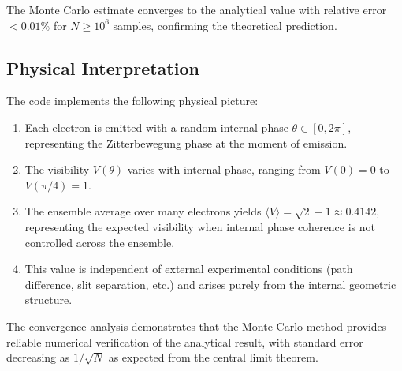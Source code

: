 \documentclass[%
 reprint,
 amsmath,amssymb,
 aps,
 prb,
]{revtex4-2}
\numberwithin{equation}{section}
\begin{document}
The Monte Carlo estimate converges to the analytical value with relative error $< 0.01\%$ for $N \geq 10^6$ samples, confirming the theoretical prediction.


\subsection{Physical Interpretation}

The code implements the following physical picture:
\begin{enumerate}
\item Each electron is emitted with a random internal phase $\theta \in [0, 2\pi]$, representing the Zitterbewegung phase at the moment of emission.
\item The visibility $V(\theta)$ varies with internal phase, ranging from $V(0) = 0$ to $V(\pi/4) = 1$.
\item The ensemble average over many electrons yields $\langle V \rangle = \sqrt{2}-1 \approx 0.4142$, representing the expected visibility when internal phase coherence is not controlled across the ensemble.
\item This value is independent of external experimental conditions (path difference, slit separation, etc.) and arises purely from the internal geometric structure.
\end{enumerate}

The convergence analysis demonstrates that the Monte Carlo method provides reliable numerical verification of the analytical result, with standard error decreasing as $1/\sqrt{N}$ as expected from the central limit theorem.

\clearpage

\end{document}
